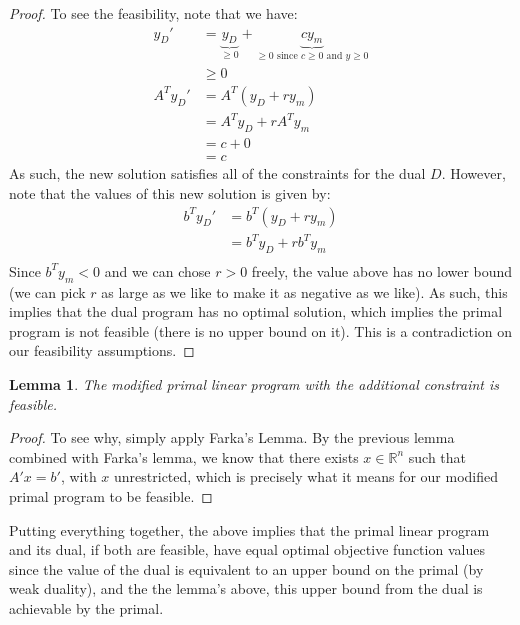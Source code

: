 \documentclass[12pt]{exam}
\newtheorem{lemma}[theorem]{Lemma}
\begin{document}
\begin{questions}
\begin{solution}
\begin{enumerate}[label=(\alph*)]
\begin{proof}
        To see the feasibility, note that we have:
        \begin{align*}
          y_{D}' &= \underbrace{y_{D}}_{\geq 0} + \underbrace{cy_m}_{\geq 0 \text{ since } c \geq 0 \text{ and } y \geq 0} \\
          &\geq 0 \\
          A^Ty_D' &= A^T(y_D + r y_m) \\
          &= A^Ty_D + rA^Ty_m \\
          &= c + 0 \tag{$A^Ty_D = c$ and $A^Ty_m = y_m^TA = 0$} \\
          &= c
        \end{align*}
        As such, the new solution satisfies all of the constraints for the dual $D$. However, note that the values of this new solution is given by:
        \begin{align*}
          b^T y_D' &= b^T(y_D + r y_m) \\
          &= b^Ty_D + rb^Ty_m \\
        \end{align*}
        Since $b^Ty_m < 0$ and we can chose $r > 0$ freely, the value above has no lower bound (we can pick $r$ as large as we like to make it as negative as we like). As such, this implies that the dual program has no optimal solution, which implies the primal program is not feasible (there is no upper bound on it). This is a contradiction on our feasibility assumptions.
      \end{proof}

      \begin{lemma}
        The modified primal linear program with the additional constraint is feasible.
      \end{lemma}
      \begin{proof}
        To see why, simply apply Farka's Lemma. By the previous lemma combined with Farka's lemma, we know that there exists $x \in \mathbb{R}^n$ such that $A'x = b'$, with $x$ unrestricted, which is precisely what it means for our modified primal program to be feasible.
      \end{proof}

      Putting everything together, the above implies that the primal linear program and its dual, if both are feasible, have equal optimal objective function values since the value of the dual is equivalent to an upper bound on the primal (by weak duality), and the the lemma's above, this upper bound from the dual is achievable by the primal.
  \end{enumerate} 
\end{solution}



\end{questions}
\end{document}
